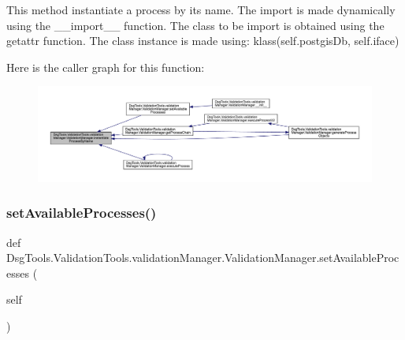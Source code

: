 \begin{DoxyVerb}This method instantiate a process by its name.
The import is made dynamically using the __import__ function.
The class to be import is obtained using the getattr function.
The class instance is made using: klass(self.postgisDb, self.iface)
\end{DoxyVerb}
 Here is the caller graph for this function\+:
\nopagebreak
\begin{figure}[H]
\begin{center}
\leavevmode
\includegraphics[width=350pt]{class_dsg_tools_1_1_validation_tools_1_1validation_manager_1_1_validation_manager_ac3667c7214510a01bb6fa1b3825de13d_icgraph}
\end{center}
\end{figure}
\mbox{\label{class_dsg_tools_1_1_validation_tools_1_1validation_manager_1_1_validation_manager_a6e35072e219132f123b62f26620097e5}} 
\subsubsection{\texorpdfstring{set\+Available\+Processes()}{setAvailableProcesses()}}
{\footnotesize\ttfamily def Dsg\+Tools.\+Validation\+Tools.\+validation\+Manager.\+Validation\+Manager.\+set\+Available\+Processes (\begin{DoxyParamCaption}\item[{}]{self }\end{DoxyParamCaption})}

